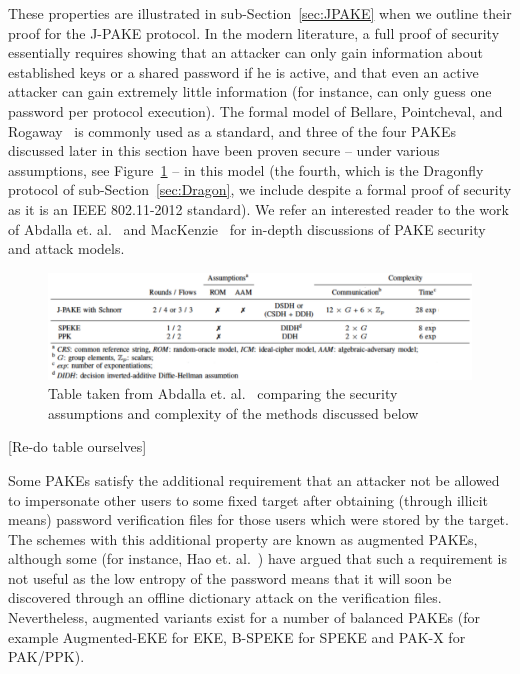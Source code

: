 \documentclass{amsart}
\newcommand{\comment}[1]{\marginpar{\color{red}{\Huge$*$}}\mbox{}{\sf\color{red}[#1]}}
\theoremstyle{remark}
\begin{document}
 These properties are illustrated in sub-Section~\ref{sec:JPAKE} when we outline their proof
 for the J-PAKE protocol. In the modern literature, a full proof of security essentially requires showing that an attacker
 can only gain information about established keys or a shared password if he is active, and that even an active
 attacker can gain extremely little information (for instance, can only guess one password per protocol execution).
 The formal model of Bellare, Pointcheval, and Rogaway~\cite{BePoRo00} is commonly used as a standard, and three of the 
 four PAKEs discussed later in this section have been proven secure -- under various assumptions, see Figure~\ref{fig:Compare} -- in
 this model (the fourth, which is the Dragonfly protocol of sub-Section~\ref{sec:Dragon}, we include despite a formal 
 proof of security as it is an IEEE 802.11-2012 standard).  We refer an interested reader to the work of 
 Abdalla et. al.~\cite{AbdBenMac15} and MacKenzie~\cite{Mac02} for in-depth discussions of PAKE security and attack models.

 \begin{figure}[ht]
 \includegraphics[width=\linewidth]{Comparisons.pdf}
 \caption{Table taken from  Abdalla et. al.~\cite{AbdBenMac15} comparing the security assumptions and complexity of the 
 methods discussed below}
 \label{fig:Compare}
 \end{figure}
 \comment{Re-do table ourselves}

 Some PAKEs satisfy the additional requirement that an attacker not be 
 allowed to impersonate other users to some fixed target after obtaining (through illicit means) password 
 verification files for those users which were stored by the target.  The schemes with this additional property 
 are known as augmented PAKEs, although some (for instance, Hao et. al.~\cite{HaYiChSh15}) have argued that 
 such a requirement is not useful as the low entropy of the password means that it will soon be discovered 
 through an offline dictionary attack on the verification files.  Nevertheless, augmented variants exist for a number
of balanced PAKEs (for example Augmented-EKE for EKE, B-SPEKE for SPEKE and PAK-X for PAK/PPK). 
\vspace{0.3in}
\end{document}
